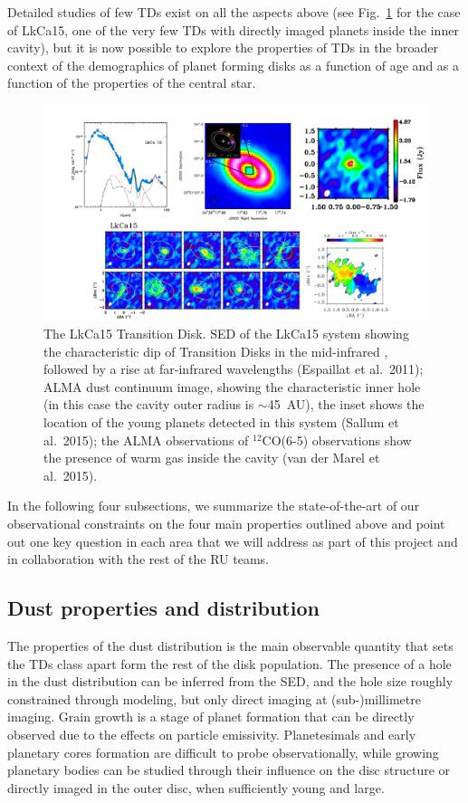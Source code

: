 \documentclass[10pt,fleqn,twoside]{article}
\begin{document}
Detailed studies of few TDs exist on all the aspects above (see Fig.~\ref{f_examples} for the case of LkCa15, one of the very few TDs with directly imaged planets inside the inner cavity), but it is now possible to explore the properties of TDs in the broader context of the demographics of planet forming disks as a function of age and as a function of the properties of the central star.  
\begin{figure}
\centerline{\includegraphics[scale=0.5]{Figure_LkCa15.pdf}}
\caption{The LkCa15 Transition Disk.  SED of the LkCa15 system showing the characteristic dip
  of Transition Disks in the mid-infrared , followed by a rise at
  far-infrared wavelengths (Espaillat et al.~2011); ALMA dust continuum
  image, showing the characteristic inner hole (in this case the cavity
  outer radius is $\sim$45~AU), the inset shows the location of the young
  planets detected in this system (Sallum et al.~2015); the ALMA
  observations of $^{12}$CO(6-5) observations show the presence of warm gas
  inside the cavity (van der Marel et al.~2015).}
\label{f_examples}
\end{figure}

In the following four subsections, we summarize the state-of-the-art of our observational constraints on the four main properties outlined above and point out one key question in each area that we will address as part of this project and in collaboration with the rest of the RU teams.

\subsection{Dust properties and distribution} 
The properties of the dust distribution is the main observable quantity that sets the TDs class apart form the rest of the disk population. The presence of a hole in the dust distribution can be inferred from the SED, and the hole size roughly constrained through modeling, but only direct imaging at (sub-)millimetre imaging.
Grain growth is a stage of planet formation that can be directly observed due to the effects on particle emissivity. Planetesimals and early planetary cores formation are difficult to probe observationally, while growing planetary bodies can be studied through their influence on the disc structure or directly imaged in the outer disc, when sufficiently young and large.
\end{document}
